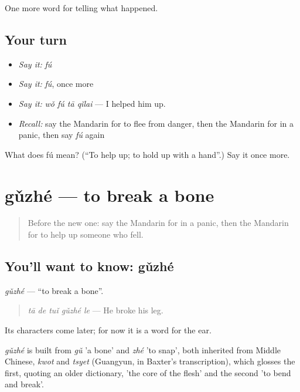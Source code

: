 \begin{grammarlens}[title={What you've built}]
One more word for telling what happened.
\end{grammarlens}

\subsection*{Your turn}
\begin{itemize}
\raggedright
  \item \emph{Say it:} \emph{fú}
  \item \emph{Say it:} \emph{fú}, once more
  \item \emph{Say it:} \emph{wǒ fú tā qǐlai} — I helped him up.
  \item \emph{Recall:} say the Mandarin for to flee from danger, then the Mandarin for in a panic, then say \emph{fú} again
\end{itemize}

\begin{tcolorbox}[breakable,colback=teal!4,colframe=teal!35!black,title={Before you move on}]
What does fú mean? (\textquotedblleft{}To help up; to hold up with a hand\textquotedblright{}.) Say it once more.
\end{tcolorbox}
\section[gǔzhé]{gǔzhé — to break a bone}

\label{lesson:ZH-C301-guzhe}



\begin{quote}
Before the new one: say the Mandarin for in a panic, then the Mandarin for to help up someone who fell.
\end{quote}

\subsection*{You'll want to know: gǔzhé}
\emph{gǔzhé} — \textquotedblleft{}to break a bone\textquotedblright{}.

\begin{quote}
\emph{tā de tuǐ gǔzhé le} — He broke his leg.
\end{quote}

Its characters come later; for now it is a word for the ear.

\begin{cousinweb}
\emph{gǔzhé} is built from \emph{gǔ} 'a bone' and \emph{zhé} 'to snap', both inherited from Middle Chinese, \emph{kwot} and \emph{tsyet} (Guangyun, in Baxter's transcription), which glosses the first, quoting an older dictionary, 'the core of the flesh' and the second 'to bend and break'.
\end{cousinweb}

